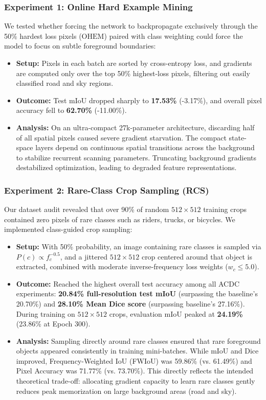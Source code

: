 \documentclass[conference]{IEEEtran}
\begin{document}
\subsubsection{Experiment 1: Online Hard Example Mining}
We tested whether forcing the network to backpropagate exclusively through the 50\% hardest loss pixels ($\text{OHEM}$) paired with class weighting could force the model to focus on subtle foreground boundaries:
\begin{itemize}
    \item \textbf{Setup:} Pixels in each batch are sorted by cross-entropy loss, and gradients are computed only over the top 50\% highest-loss pixels, filtering out easily classified road and sky regions.
    \item \textbf{Outcome:} Test mIoU dropped sharply to \textbf{17.53\%} (-3.17\%), and overall pixel accuracy fell to \textbf{62.70\%} (-11.00\%).
    \item \textbf{Analysis:} On an ultra-compact 27k-parameter architecture, discarding half of all spatial pixels caused severe gradient starvation. The compact state-space layers depend on continuous spatial transitions across the background to stabilize recurrent scanning parameters. Truncating background gradients destabilized optimization, leading to degraded feature representations.
\end{itemize}

\subsubsection{Experiment 2: Rare-Class Crop Sampling (RCS)}
Our dataset audit revealed that over 90\% of random $512 \times 512$ training crops contained zero pixels of rare classes such as riders, trucks, or bicycles. We implemented class-guided crop sampling:
\begin{itemize}
    \item \textbf{Setup:} With 50\% probability, an image containing rare classes is sampled via $P(c) \propto f_c^{-0.5}$, and a jittered $512 \times 512$ crop centered around that object is extracted, combined with moderate inverse-frequency loss weights ($w_c \le 5.0$).
    \item \textbf{Outcome:} Reached the highest overall test accuracy among all ACDC experiments: \textbf{20.84\% full-resolution test mIoU} (surpassing the baseline's 20.70\%) and \textbf{28.10\% Mean Dice score} (surpassing baseline's 27.16\%). During training on $512\times512$ crops, evaluation mIoU peaked at \textbf{24.19\%} (23.86\% at Epoch 300).
    \item \textbf{Analysis:} Sampling directly around rare classes ensured that rare foreground objects appeared consistently in training mini-batches. While mIoU and Dice improved, Frequency-Weighted IoU (FWIoU) was 59.86\% (vs. 61.49\%) and Pixel Accuracy was 71.77\% (vs. 73.70\%). This directly reflects the intended theoretical trade-off: allocating gradient capacity to learn rare classes gently reduces peak memorization on large background areas (road and sky).
\end{itemize}
\end{document}
